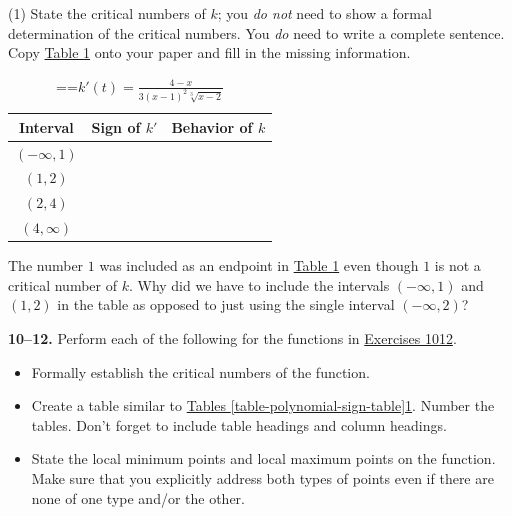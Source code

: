 \documentclass[10pt,oneside,]{book}
\theoremstyle{plain}
\theoremstyle{definition}
\numberwithin{equation}{section}
\newcommand{\fe}[2]{#1\mathopen{}\left(#2\right)\mathclose{}}
\newcommand{\ointerval}[2]{\left(#1,#2\right)}
\newcommand{\fd}[1]{#1'}
\begin{document}
\begin{exercisegroup}(1)
\exercise[7.]\hypertarget{exercise-588}{\null}State the critical numbers of \(k\); you \emph{do not} need to show a formal determination of the critical numbers.  You \emph{do} need to write a complete sentence.%
\exercise[8.]\hypertarget{exercise-589}{\null}Copy \hyperref[table-trient-rational-sign-table]{Table \ref{table-trient-rational-sign-table}} onto your paper and fill in the missing information.%
\begin{table}
\centering
\caption{\binoppenalty=\maxdimen \relpenalty=\maxdimen \(\fe{\fd{k}}{t}=\frac{4-x}{3(x-1)^2\sqrt[3]{x-2}}\)\label{table-trient-rational-sign-table}}
\begin{tabular}{cp{1.5in}p{1.5in}}
\toprule
Interval&\multicolumn{1}{c}{Sign of \(\fd{k}\)}&\multicolumn{1}{c}{Behavior of \(k\)}\\
\midrule
\(\ointerval{-\infty}{1}\)&&\\
\midrule
\(\ointerval{1}{2}\)&&\\
\midrule
\(\ointerval{2}{4}\)&&\\
\midrule
\(\ointerval{4}{\infty}\)&&\\
\bottomrule
\end{tabular}
\end{table}
\exercise[9.]\hypertarget{exercise-590}{\null}The number \(1\) was included as an endpoint in \hyperref[table-trient-rational-sign-table]{Table \ref{table-trient-rational-sign-table}} even though \(1\) is not a critical number of \(k\).  Why did we have to include the intervals \(\ointerval{-\infty}{1}\) and \(\ointerval{1}{2}\) in the table as opposed to just using the single interval \(\ointerval{-\infty}{2}\)?%
\end{exercisegroup}
\par\smallskip\noindent
\textbf{10--12. }\hypertarget{exercisegroup-115}{\null}Perform each of the following for the functions in \hyperlink{exercise-make-sign-table-first}{Exercises 10}\textendash{}\hyperlink{exercise-make-sign-table-last}{12}.%
\begin{itemize}[label=\textbullet]
\item{}Formally establish the critical numbers of the function.\item{}Create a table similar to \hyperref[table-polynomial-sign-table]{Tables \ref{table-polynomial-sign-table}}\textendash{}\hyperref[table-trient-rational-sign-table]{\ref{table-trient-rational-sign-table}}. Number the tables.  Don't forget to include table headings and column headings.\item{}State the local minimum points and local maximum points on the function.  Make sure that you explicitly address both types of points even if there are none of one type and/or the other.\end{itemize}
\end{document}
